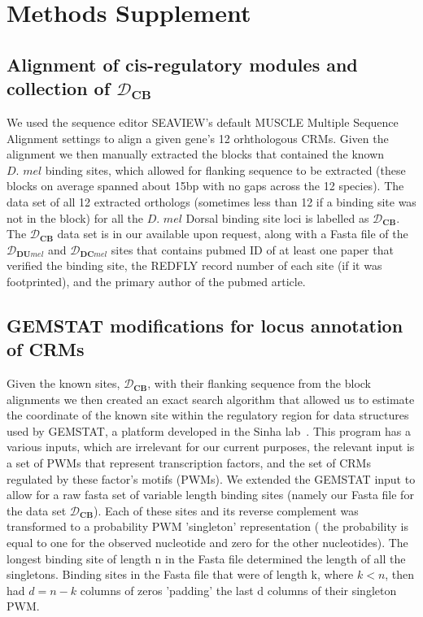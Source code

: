 \section{Methods Supplement}


\subsection{ Alignment of cis-regulatory modules and collection of $\mathcal D_{\textbf{CB}}$} \label{muscle}
	We used the sequence editor SEAVIEW's default MUSCLE Multiple Sequence Alignment settings \cite{pmid9021275} to align a given gene's 12 orhthologous CRMs\cite{BSA}.  Given the alignment we then manually extracted the blocks that contained the known $\textit{D. mel}$ binding sites, which allowed for flanking sequence to be extracted (these blocks on average spanned about 15bp with no gaps across the 12 species).  The data set of all 12 extracted orthologs (sometimes less than 12 if a binding site was not in the block) for all the $\textit{D. mel}$ Dorsal binding site loci is labelled as $\mathcal D_{\textbf{CB}}$.  The $\mathcal D_{\textbf{CB}}$ data set is in our available upon request, along with a Fasta file of the $\mathcal D_{\textbf{DU}\textit{mel}}$ and $\mathcal D_{\textbf{DC}\textit{mel}}$ sites that contains pubmed ID of at least one paper that verified the binding site, the REDFLY record number of each site (if it was footprinted), and the primary author of the pubmed article.

\subsection{GEMSTAT modifications for locus annotation of CRMs}\label{knownloc}
	 Given the known sites, $\mathcal D_{\textbf{CB}}$, with their flanking sequence from the block alignments we then created an exact search algorithm that allowed us to estimate the coordinate of the known site within the regulatory region for data structures used by GEMSTAT, a platform developed in the Sinha lab~\cite{pmid20862354}.  This program has a various inputs, which are irrelevant for our current purposes, the relevant input is a set of PWMs that represent transcription factors, and the set of CRMs regulated by these factor's motifs (PWMs).  We extended the GEMSTAT input to allow for a raw fasta set of variable length binding sites (namely our Fasta file for the data set $\mathcal D_{\textbf{CB}}$).  Each of these sites and its reverse complement was transformed to a probability PWM 'singleton' representation ( the probability is equal to one for the observed nucleotide and zero for the other nucleotides).  The longest binding site of length n in the Fasta file determined the length of all the singletons.  Binding sites in the Fasta file that were of length k, where $k < n$, then had $d=n-k$ columns of zeros 'padding' the last d columns of their singleton PWM.
	 
